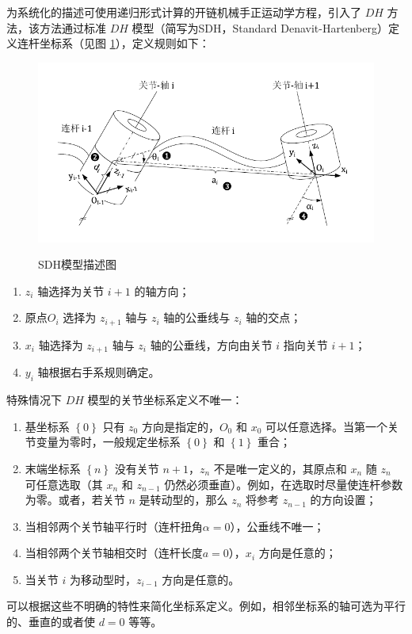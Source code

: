 \documentclass[cn,11pt,chinese,blue,bibstyle=ieeetr]{elegantbook}
\begin{document}
为系统化的描述可使用递归形式计算的开链机械手正运动学方程，引入了 $DH$ 方法，该方法通过标准 $DH$ 模型（简写为SDH，Standard Denavit-Hartenberg）定义连杆坐标系（见图 \ref{sdh_model_description}），定义规则如下：
\begin{figure}[htbp]
	\centering
	\includegraphics[scale=1.2]{images//sdh_model.pdf} \\
	\caption{SDH模型描述图}
	\label{sdh_model_description}
\end{figure}
\begin{enumerate}
\item $z_i$ 轴选择为关节 $i+1$ 的轴方向；
\item 原点$O_i$ 选择为 $z_{i+1}$ 轴与 $z_i$ 轴的公垂线与 $z_i$ 轴的交点；
\item $x_i$ 轴选择为 $z_{i+1}$ 轴与 $z_i$ 轴的公垂线，方向由关节 $i$ 指向关节 $i+1$；
\item $y_i$ 轴根据右手系规则确定。
\end{enumerate}

特殊情况下 $DH$ 模型的关节坐标系定义不唯一：
\begin{enumerate}
\item 基坐标系 $\left\{0\right\}$ 只有 $z_0$ 方向是指定的，$O_0$ 和 $x_0$ 可以任意选择。当第一个关节变量为零时，一般规定坐标系 $\left\{0\right\}$ 和 $\left\{1\right\}$ 重合；
\item 末端坐标系 $\left\{n\right\}$ 没有关节 $n+1$，$z_n$ 不是唯一定义的，其原点和 $x_n$ 随 $z_n$ 可任意选取（其 $x_n$ 和 $z_{n-1}$ 仍然必须垂直）。例如，在选取时尽量使连杆参数为零。或者，若关节 $n$ 是转动型的，那么 $z_n$ 将参考 $z_{n-1}$ 的方向设置；
\item 当相邻两个关节轴平行时（连杆扭角$\alpha=0$），公垂线不唯一；
\item 当相邻两个关节轴相交时（连杆长度$a=0$），$x_i$ 方向是任意的；
\item 当关节 $i$ 为移动型时，$z_{i-1}$ 方向是任意的。
\end{enumerate}
可以根据这些不明确的特性来简化坐标系定义。例如，相邻坐标系的轴可选为平行的、垂直的或者使 $d=0$ 等等。
\end{document}
